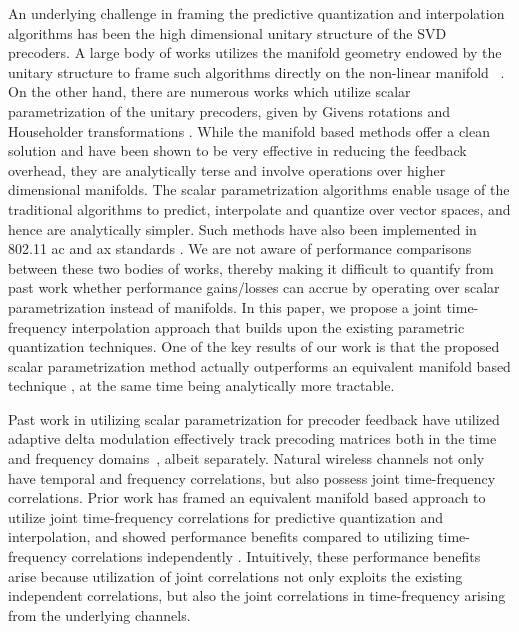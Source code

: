 \documentclass[journal,10pt,twocolumn]{IEEEtran}
\begin{document}
An underlying challenge in framing the predictive quantization and interpolation algorithms has been the high dimensional unitary structure of the SVD precoders. A large body of works utilizes the manifold geometry endowed by the unitary structure to frame such algorithms directly on the non-linear manifold ~\cite{mondal2007quantization,schwarz2013adaptive,5946308,6891198,Gupt1905:Predictive,pitaval2013codebooks}. On the other hand, there are numerous works which utilize scalar parametrization of the unitary precoders, given by Givens rotations and Householder transformations \cite{4114278,4556174,lou2013comparison}. While the manifold based methods offer a clean solution and have been shown to be very effective in reducing the feedback overhead, they are analytically terse and
involve operations over higher dimensional manifolds. The scalar parametrization algorithms enable usage of the traditional algorithms to predict, interpolate and quantize over vector spaces, and hence are analytically simpler.
Such methods have also been implemented in 802.11 ac and ax standards
\cite{lou2013comparison,ieee80211}. We are not aware of performance comparisons
between these two bodies of works, thereby making it difficult to
quantify from past work whether performance gains/losses can accrue by operating over scalar parametrization instead of manifolds. In this paper, we propose a joint time-frequency interpolation approach that builds upon the existing parametric quantization techniques. One of the key results of our work is that the proposed scalar parametrization method actually outperforms an equivalent manifold based technique \cite{Gupt1905:Predictive}, at the same time being analytically more tractable.

Past work in utilizing scalar
parametrization for precoder feedback have utilized adaptive delta
modulation effectively track precoding matrices both in the
time~\cite{4114278} and frequency domains~\cite{4556174}, albeit
separately. Natural wireless channels not only have temporal and
frequency correlations, but also possess joint time-frequency
correlations. Prior work \cite{Gupt1905:Predictive} has framed an equivalent manifold based approach to utilize joint time-frequency correlations for predictive quantization and interpolation, and showed performance benefits compared to utilizing time-frequency correlations independently \cite{6891198,khaled2005quantized}.
Intuitively, these performance benefits arise because utilization of joint
correlations not only exploits the existing independent correlations,
but also the joint correlations in time-frequency arising from the underlying channels.
\end{document}
